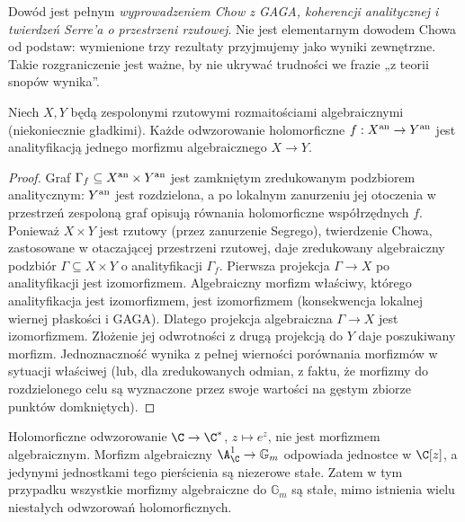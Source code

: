 \begin{uwaga}
Dowód jest pełnym \emph{wyprowadzeniem Chow z GAGA,
koherencji analitycznej i twierdzeń Serre'a o przestrzeni
rzutowej}. Nie jest elementarnym dowodem Chowa od podstaw:
wymienione trzy rezultaty przyjmujemy jako wyniki zewnętrzne.
Takie rozgraniczenie jest ważne, by nie ukrywać trudności
we frazie „z teorii snopów wynika”.
\end{uwaga}

\begin{wniosek}
\label{wn:ga9-hol-map}
Niech $X,Y$ będą zespolonymi rzutowymi rozmaitościami
algebraicznymi (niekoniecznie gładkimi). Każde
odwzorowanie holomorficzne
$f:X^{\rm an}\to Y^{\rm an}$ jest analityfikacją
jednego morfizmu algebraicznego $X\to Y$.
\end{wniosek}
\begin{proof}
Graf $\Gamma_f\subseteq X^{\rm an}\times Y^{\rm an}$
jest zamkniętym zredukowanym podzbiorem analitycznym:
$Y^{\rm an}$ jest rozdzielona, a po lokalnym zanurzeniu
jej otoczenia w przestrzeń zespoloną graf opisują
równania holomorficzne współrzędnych $f$.
Ponieważ $X\times Y$ jest rzutowy (przez zanurzenie Segrego),
twierdzenie Chowa, zastosowane w otaczającej przestrzeni
rzutowej, daje zredukowany algebraiczny podzbiór
$\Gamma\subseteq X\times Y$ o analityfikacji $\Gamma_f$.
Pierwsza projekcja $\Gamma\to X$ po analityfikacji
jest izomorfizmem.
Algebraiczny morfizm właściwy, którego analityfikacja
jest izomorfizmem, jest izomorfizmem (konsekwencja
lokalnej wiernej płaskości i GAGA). Dlatego
projekcja algebraiczna $\Gamma\to X$ jest
izomorfizmem. Złożenie jej odwrotności z drugą
projekcją do $Y$ daje poszukiwany morfizm.
Jednoznaczność wynika z pełnej wierności porównania morfizmów
w sytuacji właściwej (lub, dla zredukowanych odmian, z faktu,
że morfizmy do rozdzielonego celu są wyznaczone przez swoje
wartości na gęstym zbiorze punktów domkniętych).
\end{proof}

\begin{przyklad}
Holomorficzne odwzorowanie $\C\to\C^*$, $z\mapsto e^z$,
nie jest morfizmem algebraicznym. Morfizm algebraiczny
$\A^1_\C\to\mathbb G_m$ odpowiada jednostce w $\C[z]$,
a jedynymi jednostkami tego pierścienia są niezerowe
stałe. Zatem w tym przypadku wszystkie morfizmy
algebraiczne do $\mathbb G_m$ są stałe, mimo istnienia wielu
niestałych odwzorowań holomorficznych.
\end{przyklad}

